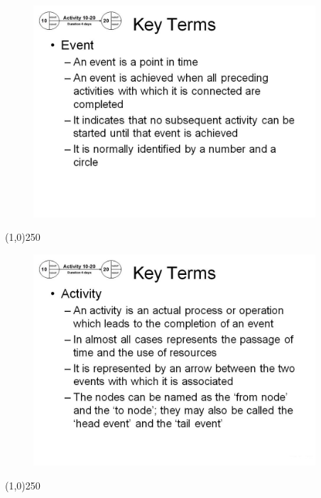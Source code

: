 \begin{frame}
\begin{figure}
	\centering
		\includegraphics[width = 10.5cm]{oldnotes/Slide55.jpg}
\end{figure}
\end{frame}
\begin{center}\line(1,0){250}\end{center}





\begin{frame}
\begin{figure}
	\centering
		\includegraphics[width = 10.5cm]{oldnotes/Slide56.jpg}
\end{figure}
\end{frame}
\begin{center}\line(1,0){250}\end{center}





